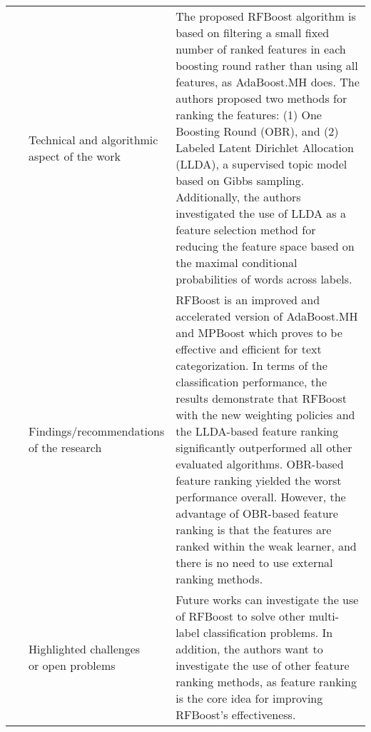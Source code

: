 \begin{landscape}
\begin{longtable}{lp{}p{}}
	\multirow{3}[0]{*}{~\citep{AlSalemi2016}} & 
    \specialcell{Technical and algorithmic \\ aspect of the work} &
	The proposed RFBoost algorithm is based on filtering a small fixed number of ranked features in each boosting round rather than using all features, as AdaBoost.MH does. The authors proposed two methods for ranking the features: (1) One Boosting Round (OBR), and (2) Labeled Latent Dirichlet Allocation (LLDA), a supervised topic model based on Gibbs sampling. Additionally, the authors investigated the use of LLDA as a feature selection method for reducing the feature space based on the maximal conditional probabilities of words across labels.     
    \\ & 
    \specialcell{Findings/recommendations \\ of the research} & 
	RFBoost is an improved and accelerated version of AdaBoost.MH and MPBoost which proves to be effective and efficient for text categorization. In terms of the classification performance, the results demonstrate that RFBoost with the new weighting policies and the LLDA-based feature ranking significantly outperformed all other evaluated algorithms.  OBR-based feature ranking yielded the worst performance overall. However, the advantage of OBR-based feature ranking is that the features are ranked within the weak learner, and there is no need to use external ranking methods.
    \\ & 
    \specialcell{Highlighted challenges \\ or open problems} & 
    Future works can investigate the use of RFBoost to solve other multi-label classification problems. In addition, the authors want to investigate the use of other feature ranking methods, as feature ranking is the core idea for improving RFBoost’s effectiveness.
	\\
	

\end{longtable}
\end{landscape}
